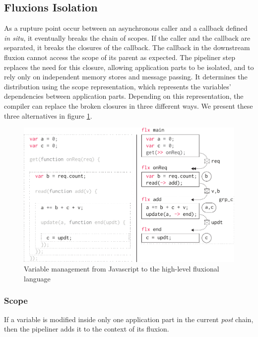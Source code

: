 \subsection{Fluxions Isolation} \label{chapter5:flx:isolation}

As a rupture point occur between an asynchronous caller and a callback defined \textit{in situ}, it eventually breaks the chain of scopes.
If the caller and the callback are separated, it breaks the closures of the callback.
The callback in the downstream fluxion cannot access the scope of its parent as expected. %
The pipeliner step replaces the need for this closure, allowing application parts to be isolated, and to rely only on independent memory stores and message passing.
It determines the distribution using the scope representation, which represents the variables' dependencies between application parts.
Depending on this representation, the compiler can replace the broken closures in three different ways.
We present these three alternatives in figure \ref{fig:states}.

\begin{figure}[h!]
  \centering
  \includegraphics[width=0.7\linewidth]{../resources/states.pdf}
  \caption{Variable management from Javascript to the high-level fluxional language}
  \label{fig:states}
\end{figure}

\subsubsection{Scope}
If a variable is modified inside only one application part in the current \textit{post} chain, then the pipeliner adds it to the context of its fluxion.

